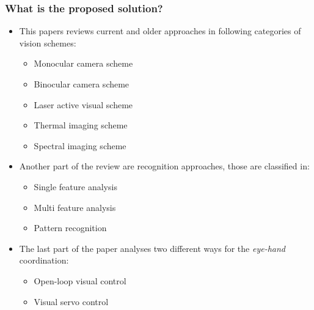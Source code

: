 \subsubsection*{What is the proposed solution?}
\begin{itemize}
    \item This papers reviews current and older approaches in following categories of vision schemes:
    \begin{itemize}
        \item Monocular camera scheme
        \item Binocular camera scheme
        \item Laser active visual scheme
        \item Thermal imaging scheme
        \item Spectral imaging scheme
    \end{itemize} 
    \item Another part of the review are recognition approaches, those are classified in:
    \begin{itemize}
        \item Single feature analysis
        \item Multi feature analysis
        \item Pattern recognition 
    \end{itemize}
    \item The last part of the paper analyses two different ways for the \emph{eye-hand} coordination:
    \begin{itemize}
        \item Open-loop visual control
        \item Visual servo control
    \end{itemize} 
\end{itemize}
